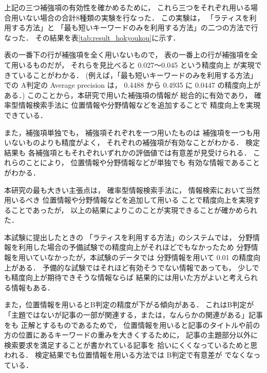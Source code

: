 上記の三つ補強項の有効性を確かめるために，
これら三つをそれぞれ用いる場合用いない場合の合計8種類の実験を行なった．
この実験は，
「ラティスを利用する方法」と
「最も短いキーワードのみを利用する方法」の二つの方法で行なった．
その結果を表\ref{tab:result_hokyoukou}に示す．

表の一番下の行が補強項を全く用いないもので，
表の一番上の行が補強項を全て用いるものだが，
それらを見比べると 0.027〜0.045 という精度向上
が実現できていることがわかる．
(例えば，「最も短いキーワードのみを利用する方法」での
A判定の Average precision は，
0.4488 から 0.4935 に 0.0447 の精度向上がある．)
このことから，本研究で用いた補強項の情報が
総合的に有効であり，
確率型情報検索手法に
位置情報や分野情報などを追加することで
精度向上を実現できている．

また，補強項単独でも，
補強項それぞれを一つ用いたものは
補強項を一つも用いないものよりも精度がよく，
それぞれの補強項が有効なことがわかる．
検定結果も
各補強項ともそれぞれいずれかの評価値では有意差が見受けられる．
これらのことにより，
位置情報や分野情報などが単独でも
有効な情報であることがわかる．

本研究の最も大きい主張点は，
確率型情報検索手法に，
情報検索において当然用いるべき
位置情報や分野情報などを追加して用いる
ことで精度向上を実現することであったが，
以上の結果によりこのことが実現できることが確かめられた．

本試験に提出したときの
「ラティスを利用する方法」のシステムでは，
分野情報を利用した場合の予備試験での精度向上がそれほどでもなかったため
分野情報を用いていなかったが，本試験のデータでは
分野情報を用いて 0.01 の精度向上がある．
予備的な試験ではそれほど有効そうでない情報であっても，
少しでも精度向上が期待できそうな情報ならば
結果的には用いた方がよいと考えられる情報もある．

また，位置情報を用いるとB判定の精度が下がる傾向がある．
これはB判定が「主題ではないが記事の一部が関連する，または，なんらかの関連がある」記事をも
正解とするものであるためで，
位置情報を用いると記事のタイトルや前の方の位置にあるキーワードの重みを大きくするために，
記事の主題部分以外に検索要求を満足することが書かれている記事を
拾いにくくなっているためと思われる．
検定結果でも位置情報を用いる方法では B判定で有意差が
でなくなっている．

